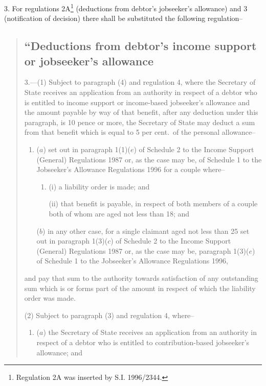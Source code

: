 \documentclass[12pt,a4paper]{article}
\begin{document}
3.  For regulations 2A\footnote{\frenchspacing Regulation 2A was inserted by S.I. 1996/2344.} (deductions from debtor’s jobseeker’s allowance) and 3 (notification of decision) there shall be substituted the following regulation–
\begin{quotation}
\subsection*{“Deductions from debtor’s income support or jobseeker’s allowance}

3.---(1)  Subject to paragraph (4) and regulation 4, where the Secretary of State receives an application from an authority in respect of a debtor who is entitled to income support or income-based jobseeker’s allowance and the amount payable by way of that benefit, after any deduction under this paragraph, is 10 pence or more, the Secretary of State may deduct a sum from that benefit which is equal to 5 per cent.\ of the personal allowance–
\begin{enumerate}\item[]
($a$) set out in paragraph 1(1)($e$)  of Schedule 2 to the Income Support (General) Regulations 1987 or, as the case may be, of Schedule 1 to the Jobseeker’s Allowance Regulations 1996 for a couple where–
\begin{enumerate}\item[]
(i) a liability order is made; and

(ii) that benefit is payable, in respect of both members of a couple both of whom are aged not less than 18; and
\end{enumerate}

($b$) in any other case, for a single claimant aged not less than 25 set out in paragraph 1(3)($c$)  of Schedule 2 to the Income Support (General) Regulations 1987 or, as the case may be, paragraph 1(3)($e$)  of Schedule 1 to the Jobseeker’s Allowance Regulations 1996,
\end{enumerate}
and pay that sum to the authority towards satisfaction of any outstanding sum which is or forms part of the amount in respect of which the liability order was made.

(2) Subject to paragraph (3) and regulation 4, where–
\begin{enumerate}\item[]
($a$) the Secretary of State receives an application from an authority in respect of a debtor who is entitled to contribution-based jobseeker’s allowance; and


\end{enumerate}
\end{quotation}
\end{document}
